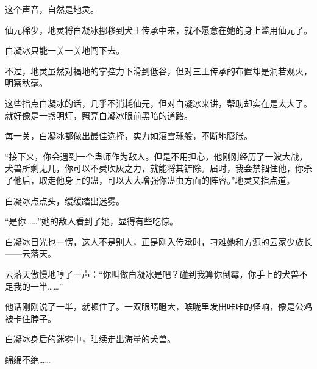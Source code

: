 \begin{this_body}
这个声音，自然是地灵。

仙元稀少，地灵将白凝冰挪移到犬王传承中来，就不愿意在她的身上滥用仙元了。

白凝冰只能一关一关地闯下去。

不过，地灵虽然对福地的掌控力下滑到低谷，但对三王传承的布置却是洞若观火，明察秋毫。

这些指点白凝冰的话，几乎不消耗仙元，但对白凝冰来讲，帮助却实在是太大了。就好像是一盏明灯，照亮白凝冰眼前黑暗的道路。

每一关，白凝冰都做出最佳选择，实力如滚雪球般，不断地膨胀。

“接下来，你会遇到一个蛊师作为敌人。但是不用担心，他刚刚经历了一波大战，犬兽所剩无几，你可以不费吹灰之力，就能将其铲除。届时，我会禁锢住他，你杀了他后，取走他身上的蛊，可以大大增强你蛊虫方面的阵容。”地灵又指点道。

白凝冰点点头，缓缓踏出迷雾。

“是你……”她的敌人看到了她，显得有些吃惊。

白凝冰目光也一愣，这人不是别人，正是刚入传承时，刁难她和方源的云家少族长——云落天。

云落天傲慢地哼了一声：“你叫做白凝冰是吧？碰到我算你倒霉，你手上的犬兽不足我的一半……”

他话刚刚说了一半，就顿住了。一双眼睛瞪大，喉咙里发出咔咔的怪响，像是公鸡被卡住脖子。

白凝冰身后的迷雾中，陆续走出海量的犬兽。

绵绵不绝……

\end{this_body}

